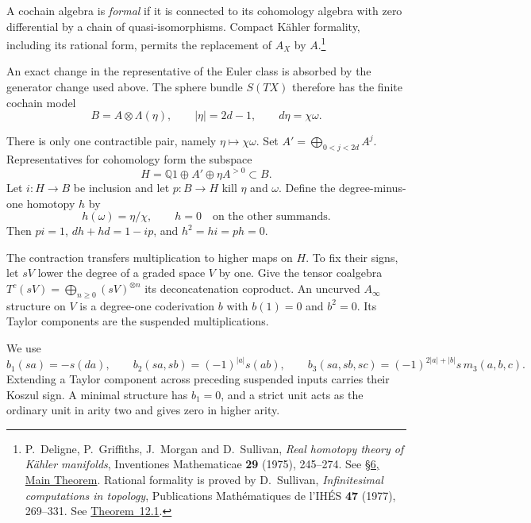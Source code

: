 A cochain algebra is \emph{formal} if it is connected to its cohomology
algebra with zero differential by a chain of quasi-isomorphisms.
Compact K\"ahler formality, including its rational form, permits the
replacement of $A_X$ by $A$.\footnote{P.~Deligne, P.~Griffiths,
J.~Morgan and D.~Sullivan, \emph{Real homotopy theory of K\"ahler
manifolds}, Inventiones Mathematicae \textbf{29} (1975), 245--274.
See
\href{https://www.math.stonybrook.edu/~dennis/publications/PDF/DS-pub-0024.pdf}
{\S6, Main Theorem}. Rational formality is proved by
D.~Sullivan, \emph{Infinitesimal computations
in topology}, Publications Math\'ematiques de l'IH\'ES
\textbf{47} (1977), 269--331.
See
\href{https://www.math.stonybrook.edu/~dennis/publications/PDF/DS-pub-0039.pdf}
{Theorem~12.1}.}

An exact change in the representative of the Euler class is absorbed
by the generator change used above. The sphere bundle $S(TX)$ therefore
has the finite cochain model
\begin{equation}\label{df:eq:finite}
 B=A\otimes\Lambda(\eta),\qquad
 |\eta|=2d-1,\qquad d\eta=\chi\omega.
\end{equation}

There is only one contractible pair, namely $\eta\mapsto\chi\omega$.
Set $A'=\bigoplus_{0<j<2d}A^j$. Representatives for cohomology form
the subspace
\begin{equation}\label{df:eq:cohomology}
 H=\mathbb Q1\oplus A'\oplus\eta A^{>0}\subset B.
\end{equation}
Let $i:H\to B$ be inclusion and let $p:B\to H$ kill $\eta$ and
$\omega$. Define the degree-minus-one homotopy $h$ by
\begin{equation}\label{df:eq:contraction}
 h(\omega)=\eta/\chi,\qquad h=0
 \quad\text{on the other summands}.
\end{equation}
Then $pi=1$, $dh+hd=1-ip$, and $h^2=hi=ph=0$.

The contraction transfers multiplication to higher maps on $H$.
To fix their signs, let $sV$ lower the degree of a graded space $V$ by one.
Give the tensor coalgebra
$T^c(sV)=\bigoplus_{n\geq0}(sV)^{\otimes n}$ its deconcatenation
coproduct. An uncurved $A_\infty$ structure on $V$ is a degree-one
coderivation $b$ with $b(1)=0$ and $b^2=0$.
Its Taylor components are the suspended multiplications.

We use
\[
 b_1(sa)=-s(da),\qquad
 b_2(sa,sb)=(-1)^{|a|}s(ab),\qquad
 b_3(sa,sb,sc)=(-1)^{2|a|+|b|}s\,m_3(a,b,c).
\]
Extending a Taylor component across preceding suspended inputs carries
their Koszul sign. A minimal structure has $b_1=0$, and a strict unit
acts as the ordinary unit in arity two and gives zero in higher arity.

